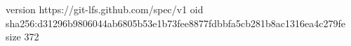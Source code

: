 version https://git-lfs.github.com/spec/v1
oid sha256:d31296b9806044ab6805b53e1b73fee8877fdbbfa5cb281b8ac1316ea4c279fe
size 372
